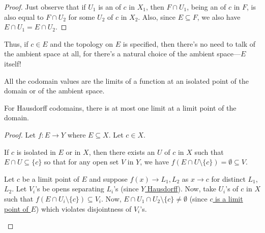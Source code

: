 \begin{lem}
\begin{center}
		\end{center}
	\end{lem}
	
	\begin{proof}
		Just observe that if $U_1$ is an \onbd of $c$ in $X_1$, then $F\cap U_1$, being an \onbd of $c$ in $F$, is also equal to $F\cap U_2$ for some \onbd $U_2$ of $c$ in $X_2$. Also, since $E\subseteq F$, we also have $E\cap U_1 = E\cap U_2$.
	\end{proof}
	
	\begin{rmk}
		Thus, if $c\in E$ and the topology on $E$ is specified, then there's no need to talk of the ambient space at all, for there's a natural choice of the ambient space---$E$ itself!
	\end{rmk}
	
	\begin{lem}\label{LEM: lims at isolated and lim pts}
		\leavevmode
		\begin{mylist}
			\item\label{LEMi: lims at isolated and lim pts} All the codomain values are the limits of a function at an isolated point of the domain or of the ambient space.
			
			\item\label{LEMii: lims at isolated and lim pts} For Hausdorff codomains, there is at most one limit at a limit point of the domain.
		\end{mylist}
	\end{lem}
	
	\begin{proof}
		Let $f\colon E\to Y$ where $E\subseteq X$. Let $c\in X$.
		\begin{mylist}
			\item If $c$ is isolated in $E$ or in $X$, then there exists an \onbd $U$ of $c$ in $X$ such that $E\cap U \subseteq \{c\}$ so that for any open set $V$ in $Y$, we have $f(E\cap U\setminus\{c\}) = \emptyset\subseteq V$.
			
			\item Let $c$ be a limit point of $E$ and suppose $f(x)\to L_1, L_2$ as $x\to c$ for distinct $L_1$, $L_2$. Let $V_i$'s be opens separating $L_i$'s (since \uline{$Y$ Hausdorff}). Now, take  $U_i$'s of $c$ in $X$ such that $f(E\cap U_i\setminus\{c\})\subseteq V_i$. Now, $E\cap U_1\cap U_2\setminus\{c\}\ne\emptyset$ (since \uline{$c$ is a limit point of $E$}) which violates disjointness of $V_i$'s.\qedhere
		\end{mylist}
	\end{proof}
	

